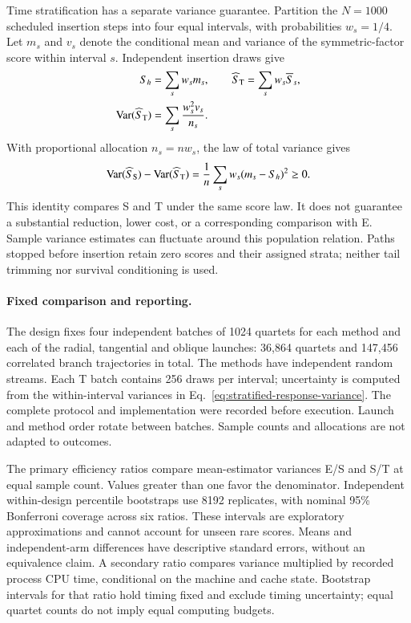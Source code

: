 \documentclass[aps,prd,reprint,amsmath,amssymb,superscriptaddress,nofootinbib,longbibliography,floatfix]{revtex4-2}
\begin{document}
Time stratification has a separate variance guarantee. Partition the $N=1000$ scheduled insertion steps into four equal intervals, with probabilities $w_s=1/4$. Let $m_s$ and $v_s$ denote the conditional mean and variance of the symmetric-factor score within interval $s$. Independent insertion draws give
\begin{align}
S_h&=\sum_s w_s m_s,\qquad
\widehat S_{\rm T}=\sum_s w_s\overline S_s,\nonumber\\
\operatorname{Var}(\widehat S_{\rm T})
&=\sum_s\frac{w_s^2v_s}{n_s}.
\label{eq:stratified-response-variance}
\end{align}
With proportional allocation $n_s=nw_s$, the law of total variance gives
\begin{equation}
\operatorname{Var}(\widehat S_{\rm S})-
\operatorname{Var}(\widehat S_{\rm T})
=\frac{1}{n}\sum_s w_s(m_s-S_h)^2\geq0.
\label{eq:time-stratification-gain}
\end{equation}
This identity compares S and T under the same score law. It does not guarantee a substantial reduction, lower cost, or a corresponding comparison with E. Sample variance estimates can fluctuate around this population relation. Paths stopped before insertion retain zero scores and their assigned strata; neither tail trimming nor survival conditioning is used.

\paragraph{Fixed comparison and reporting.}
The design fixes four independent batches of 1024 quartets for each method and each of the radial, tangential and oblique launches: 36,864 quartets and 147,456 correlated branch trajectories in total. The methods have independent random streams. Each T batch contains 256 draws per interval; uncertainty is computed from the within-interval variances in Eq.~\eqref{eq:stratified-response-variance}. The complete protocol and implementation were recorded before execution. Launch and method order rotate between batches. Sample counts and allocations are not adapted to outcomes.

The primary efficiency ratios compare mean-estimator variances E/S and S/T at equal sample count. Values greater than one favor the denominator. Independent within-design percentile bootstraps use 8192 replicates, with nominal 95\% Bonferroni coverage across six ratios. These intervals are exploratory approximations and cannot account for unseen rare scores. Means and independent-arm differences have descriptive standard errors, without an equivalence claim. A secondary ratio compares variance multiplied by recorded process CPU time, conditional on the machine and cache state. Bootstrap intervals for that ratio hold timing fixed and exclude timing uncertainty; equal quartet counts do not imply equal computing budgets.
\end{document}
